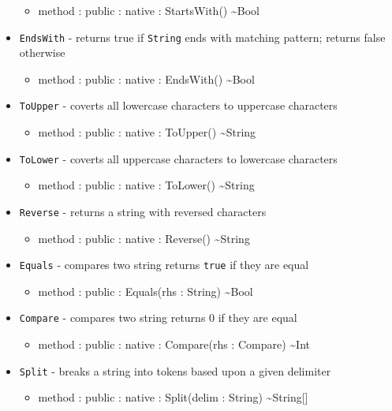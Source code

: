 \documentclass[11pt]{article}
\begin{document}
\begin{itemize}
  \begin{itemize}
  \item method : public : native : StartsWith() \textasciitilde Bool
  \end{itemize}
\item \texttt{EndsWith} - returns true if \texttt{String} ends with
  matching pattern; returns false otherwise
  \begin{itemize}
  \item method : public : native : EndsWith() \textasciitilde Bool
  \end{itemize}
\item \texttt{ToUpper} - coverts all lowercase characters to uppercase
  characters
  \begin{itemize}
  \item method : public : native : ToUpper() \textasciitilde String
  \end{itemize}
\item \texttt{ToLower} - coverts all uppercase characters to lowercase
  characters
  \begin{itemize}
  \item method : public : native : ToLower() \textasciitilde String
  \end{itemize}
\item \texttt{Reverse} - returns a string with reversed characters
  \begin{itemize}
  \item method : public : native : Reverse() \textasciitilde String
  \end{itemize}
\item \texttt{Equals} - compares two string returns \texttt{true} if
  they are equal
  \begin{itemize}
  \item method : public : Equals(rhs : String) \textasciitilde Bool
  \end{itemize}
\item \texttt{Compare} - compares two string returns 0 if they are
  equal
  \begin{itemize}
  \item method : public : native : Compare(rhs : Compare)
    \textasciitilde Int
  \end{itemize}
\item \texttt{Split} - breaks a string into tokens based upon a given
  delimiter
  \begin{itemize}
  \item method : public : native : Split(delim : String)
    \textasciitilde String[]

\end{itemize}
\end{itemize}
\end{document}
